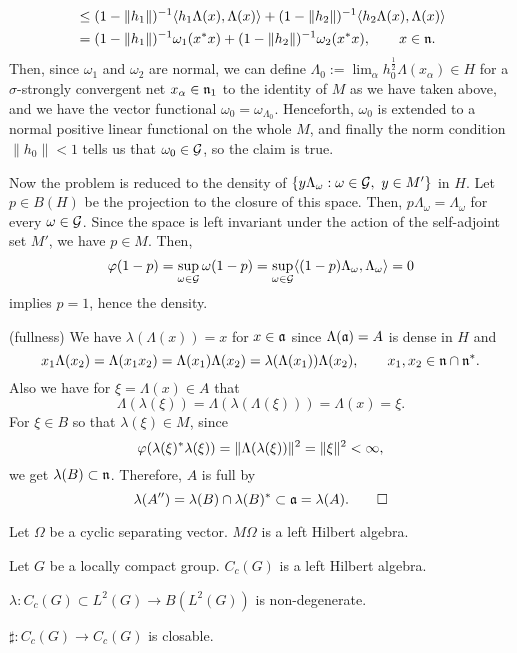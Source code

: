 \documentclass{../../large}
\begin{document}
\begin{pf}
\begin{align*}
&\le(1-\|h_1\|)^{-1}\langle h_1\Lambda(x),\Lambda(x)\rangle+(1-\|h_2\|)^{-1}\langle h_2\Lambda(x),\Lambda(x)\rangle\\
&=(1-\|h_1\|)^{-1}\omega_1(x^*x)+(1-\|h_2\|)^{-1}\omega_2(x^*x),\qquad x\in\mathfrak{n}.
\end{align*}
Then, since $\omega_1$ and $\omega_2$ are normal, we can define $\Lambda_0:=\lim_\alpha h_0^{\frac12}\Lambda(x_\alpha)\in H$ for a $\sigma$-strongly convergent net $x_\alpha\in\mathfrak{n}_1$ to the identity of $M$ as we have taken above, and we have the vector functional $\omega_0=\omega_{\Lambda_0}$.
Henceforth, $\omega_0$ is extended to a normal positive linear functional on the whole $M$, and finally the norm condition $\|h_0\|<1$ tells us that $\omega_0\in\mathcal{G}$, so the claim is true.

Now the problem is reduced to the density of $\{y\Lambda_{\omega}:\omega\in\mathcal{G},\ y\in M'\}$ in $H$.
Let $p\in B(H)$ be the projection to the closure of this space.
Then, $p\Lambda_\omega=\Lambda_\omega$ for every $\omega\in\mathcal{G}$.
Since the space is left invariant under the action of the self-adjoint set $M'$, we have $p\in M$.
Then,
\[\varphi(1-p)=\sup_{\omega\in\mathcal{G}}\omega(1-p)=\sup_{\omega\in\mathcal{G}}\langle(1-p)\Lambda_\omega,\Lambda_\omega\rangle=0\]
implies $p=1$, hence the density.

(fullness)
We have $\lambda(\Lambda(x))=x$ for $x\in\mathfrak{a}$ since $\Lambda(\mathfrak{a})=A$ is dense in $H$ and
\[x_1\Lambda(x_2)=\Lambda(x_1x_2)=\Lambda(x_1)\Lambda(x_2)=\lambda(\Lambda(x_1))\Lambda(x_2),\qquad x_1,x_2\in\mathfrak{n}\cap\mathfrak{n}^*.\]
Also we have for $\xi=\Lambda(x)\in A$ that
\[\Lambda(\lambda(\xi))=\Lambda(\lambda(\Lambda(\xi)))=\Lambda(x)=\xi.\]
For $\xi\in B$ so that $\lambda(\xi)\in M$, since
\[\varphi(\lambda(\xi)^*\lambda(\xi))=\|\Lambda(\lambda(\xi))\|^2=\|\xi\|^2<\infty,\]
we get $\lambda(B)\subset\mathfrak{n}$.
Therefore, $A$ is full by
\[\lambda(A'')=\lambda(B)\cap\lambda(B)^*\subset\mathfrak{a}=\lambda(A).\qedhere\]


\end{pf}


\begin{prb}
Let $\Omega$ be a cyclic separating vector.
$M\Omega$ is a left Hilbert algebra.
\end{prb}

\begin{prb}
Let $G$ be a locally compact group.
$C_c(G)$ is a left Hilbert algebra.
\begin{parts}
\item $\lambda:C_c(G)\subset L^2(G)\to B(L^2(G))$ is non-degenerate.
\item $\sharp:C_c(G)\to C_c(G)$ is closable.
\end{parts}
\end{prb}
\end{document}
